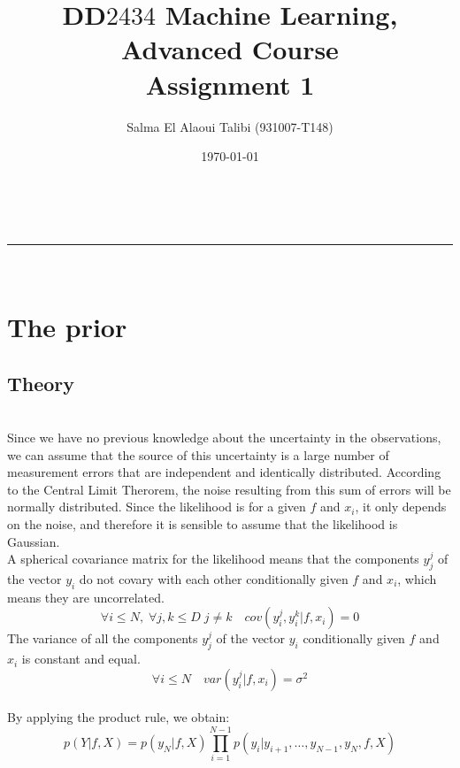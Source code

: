 \documentclass[a4paper,11pt]{article}
\makeatletter
\newcommand{\linia}{\rule{\linewidth}{0.5pt}}
\theoremstyle{mytheor}
\renewcommand{\maketitle}{
\begin{center}
\vspace{2ex}
{\huge \textsc{\@title}}
\vspace{1ex}
\\
\linia\\
\@author \hfill \@date
\vspace{4ex}
\end{center}
}
\makeatother
\begin{document}
\title{DD$2434$ Machine Learning, Advanced Course\\ Assignment 1 }

\author{Salma El Alaoui Talibi (931007-T148)}

\date{\today}

\maketitle

\section{The prior}

\subsection{Theory}

\smallskip
\\Since we have no previous knowledge about the uncertainty in the observations, we can assume that the source of this uncertainty is a large number of measurement errors that are independent and identically distributed. According to the Central Limit Therorem, the noise resulting from this sum of errors will be normally distributed. Since the likelihood is for a given $f$ and $x_i$, it only depends on the noise, and therefore it is sensible to assume that the likelihood is Gaussian.\\
A spherical covariance matrix for the likelihood means that the components $y^{j}_j$ of the vector $y_i$ do not covary with each other conditionally given $f$ and $x_{i}$, which means they are uncorrelated. 
\begin{equation*}
\forall i \leq N , \; \forall j,k\leq D \;j \neq k  \quad cov(y^j_{i}, y^k_{i} | f, x_i ) = 0
\end{equation*} 
The variance of all the components $y^{j}_j$ of the vector $y_i$ conditionally given $f$ and $x_{i}$ is constant and equal.
\begin{equation*}
\forall i \leq N \quad var(y^j_{i}| f, x_i ) = \sigma^2
\end{equation*} 
\smallskip
{}
\smallskip
\\By applying the product rule, we obtain:
\begin{equation*}
p \left({Y| f, X} \right) = p \left ({y_N | f, X} \right) \prod\limits_{i=1}^{N - 1} p\left ({y_i|y_{i+1},\ldots,y_{N-1},y_N,f,X} \right)
\end{equation*}
\end{document}
